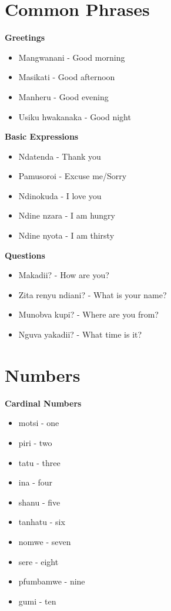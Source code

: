 \documentclass[10pt,twoside]{book}
\begin{document}
\chapter{Common Phrases}
\begin{multicols}{2}
\raggedright

\textbf{Greetings}
\begin{itemize}[leftmargin=*]
\item Mangwanani - Good morning
\item Masikati - Good afternoon  
\item Manheru - Good evening
\item Usiku hwakanaka - Good night
\end{itemize}

\textbf{Basic Expressions}
\begin{itemize}[leftmargin=*]
\item Ndatenda - Thank you
\item Pamusoroi - Excuse me/Sorry
\item Ndinokuda - I love you
\item Ndine nzara - I am hungry
\item Ndine nyota - I am thirsty
\end{itemize}

\textbf{Questions}
\begin{itemize}[leftmargin=*]
\item Makadii? - How are you?
\item Zita renyu ndiani? - What is your name?
\item Munobva kupi? - Where are you from?
\item Nguva yakadii? - What time is it?
\end{itemize}

\end{multicols}

\chapter{Numbers}
\begin{multicols}{2}
\raggedright

\textbf{Cardinal Numbers}
\begin{itemize}[leftmargin=*]
\item motsi - one
\item piri - two
\item tatu - three
\item ina - four
\item shanu - five
\item tanhatu - six
\item nomwe - seven
\item sere - eight
\item pfumbamwe - nine
\item gumi - ten
\end{itemize}

\end{multicols}
\end{document}
